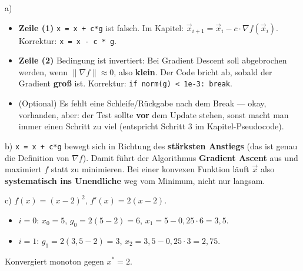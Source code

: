 \documentclass[11pt, a4paper]{article}
\begin{document}
a)

\begin{itemize}
  \item \textbf{Zeile (1)} \texttt{x = x + c*g} ist falsch. Im Kapitel: $\vec x_{i+1} = \vec x_i - c\cdot\nabla f(\vec x_i)$. Korrektur: \texttt{x = x - c * g}.
  \item \textbf{Zeile (2)} Bedingung ist invertiert: Bei Gradient Descent soll abgebrochen werden, wenn $\|\nabla f\| \approx 0$, also \textbf{klein}. Der Code bricht ab, sobald der Gradient \textbf{groß} ist. Korrektur: \texttt{if norm(g) < 1e-3: break}.
  \item (Optional) Es fehlt eine Schleife/Rückgabe nach dem Break — okay, vorhanden, aber: der Test sollte \textbf{vor} dem Update stehen, sonst macht man immer einen Schritt zu viel (entspricht Schritt 3 im Kapitel-Pseudocode).
\end{itemize}

b) \texttt{x = x + c*g} bewegt sich in Richtung des \textbf{stärksten Anstiegs} (das ist genau die Definition von $\nabla f$). Damit führt der Algorithmus \textbf{Gradient Ascent} aus und maximiert $f$ statt zu minimieren. Bei einer konvexen Funktion läuft $\vec x$ also \textbf{systematisch ins Unendliche} weg vom Minimum, nicht nur langsam.


c) $f(x) = (x-2)^2$, $f'(x) = 2(x-2)$.

\begin{itemize}
  \item $i=0$: $x_0 = 5$, $g_0 = 2(5-2) = 6$, $x_1 = 5 - 0{,}25 \cdot 6 = 3{,}5$.
  \item $i=1$: $g_1 = 2(3{,}5-2) = 3$, $x_2 = 3{,}5 - 0{,}25\cdot 3 = 2{,}75$.
\end{itemize}

Konvergiert monoton gegen $x^* = 2$.





\end{document}
